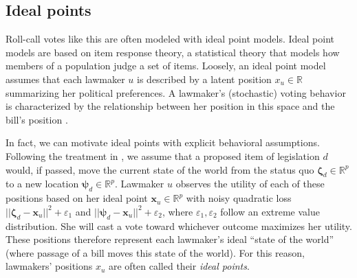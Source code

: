 \subsection*{Ideal points}

Roll-call votes like this are often modeled with ideal point models.  Ideal point
models are based on item response theory, a statistical theory that
models how members of a population judge a set of items.  Loosely, an
ideal point model assumes that each lawmaker $u$ is described by a
latent position $x_u \in \mathbb{R}$ summarizing her political
preferences.  A lawmaker's (stochastic) voting behavior is
characterized by the relationship between her position in this space
and the bill's position
\citep{poole:1985,poole:1991,jackman:2001,martin:2002,clinton:2004}.

In fact, we can motivate ideal points with explicit behavioral
assumptions.  Following the treatment in \cite{clinton:2004}, we
assume that a proposed item of legislation $d$ would, if passed, move
the current state of the world from the status quo $\bm \zeta_d \in
\mathbb{R}^p$ to a new location $\bm \psi_d \in \mathbb{R}^p$.
Lawmaker $u$ observes the utility of each of these positions based on
her ideal point $\bm x_u \in \mathbb{R}^p$ with noisy quadratic loss
$|| \bm \zeta_d - \bm x_u ||^2 + \varepsilon_1$ and $|| \bm \psi_d -
\bm x_u ||^2 + \varepsilon_2$, where $\varepsilon_1, \varepsilon_2$
follow an extreme value distribution.  She will cast a vote toward
whichever outcome maximizes her utility.  These positions therefore
represent each lawmaker's ideal ``state of the world'' (where passage
of a bill moves this state of the world).  For this reason, lawmakers'
positions $x_u$ are often called their \emph{ideal points}.


